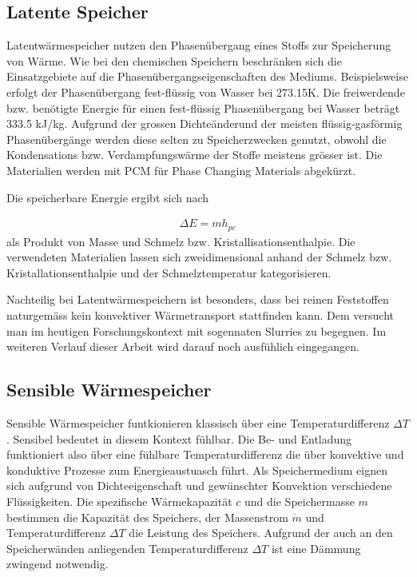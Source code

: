 \documentclass[11pt,a4paper]{scrartcl}
\begin{document}
\subsection{Latente Speicher}
Latentwärmespeicher nutzen den Phasenübergang eines Stoffs zur Speicherung von
Wärme. Wie bei den chemischen Speichern beschränken sich die Einsatzgebiete auf
die Phasenübergangseigenschaften des Mediums. Beispielsweise erfolgt der
Phasenübergang fest-flüssig von Wasser bei 273.15K. Die freiwerdende bzw.
benötigte Energie für einen fest-flüssig Phasenübergang bei Wasser beträgt 333.5 kJ/kg.
Aufgrund der grossen Dichteänderund der meisten flüssig-gasförmig
Phasenübergänge werden diese selten zu Speicherzwecken genutzt, obwohl die
Kondensations bzw. Verdampfungswärme der Stoffe meistens grösser ist. Die
Materialien werden mit PCM für \flqq Phase Changing Materials\frqq{} abgekürzt.

Die speicherbare Energie ergibt sich nach

\begin{align}
\Delta E = mh_{pc}
\end{align}
als Produkt von Masse und Schmelz bzw. Kristallisationsenthalpie. Die
verwendeten Materialien lassen sich zweidimensional anhand der
Schmelz bzw. Kristallationsenthalpie und der Schmelztemperatur kategorisieren. 

Nachteilig bei Latentwärmespeichern ist besonders, dass bei reinen Feststoffen
naturgemäss kein konvektiver Wärmetransport stattfinden kann. Dem versucht man
im heutigen Forschungskontext mit sogennaten Slurries zu begegnen. Im weiteren
Verlauf dieser Arbeit wird darauf noch ausfühlich eingegangen. \cite{Wesselak}

\subsection{Sensible Wärmespeicher}

Sensible Wärmespeicher funtkionieren klassisch über eine Temperaturdifferenz
$\Delta T$. Sensibel bedeutet in diesem Kontext \flqq fühlbar\frqq{}. Die
Be- und Entladung funktioniert also über eine \flqq fühlbare\frqq{}
Temperaturdifferenz die über konvektive und konduktive Prozesse zum
Energieaustuasch führt. Als Speichermedium eignen sich aufgrund von
Dichteeigenschaft und gewünschter Konvektion verschiedene Flüssigkeiten. Die spezifische
Wärmekapazität $c$ und die Speichermasse $m$ bestimmen die Kapazität des
Speichers, der Massenstrom $\dot{m}$ und Temperaturdifferenz $\Delta T$ die
Leistung des Speichers. Aufgrund der auch an den Speicherwänden anliegenden
Temperaturdifferenz $\Delta T$ ist eine Dämmung zwingend notwendig. 
\end{document}
